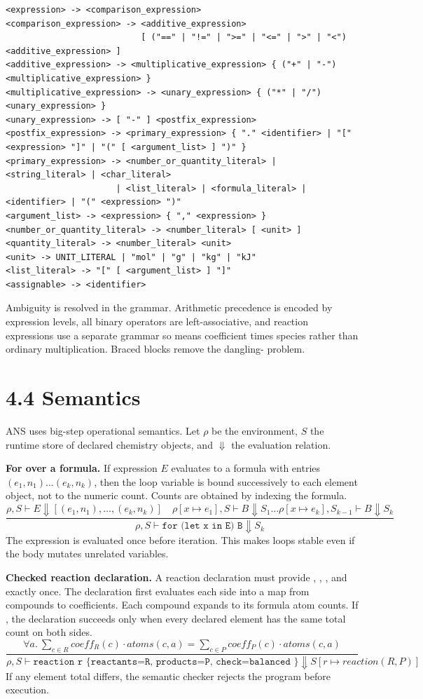 \begin{lstlisting}[style=ebnf]
<expression> -> <comparison_expression>
<comparison_expression> -> <additive_expression>
                           [ ("==" | "!=" | ">=" | "<=" | ">" | "<") <additive_expression> ]
<additive_expression> -> <multiplicative_expression> { ("+" | "-") <multiplicative_expression> }
<multiplicative_expression> -> <unary_expression> { ("*" | "/") <unary_expression> }
<unary_expression> -> [ "-" ] <postfix_expression>
<postfix_expression> -> <primary_expression> { "." <identifier> | "[" <expression> "]" | "(" [ <argument_list> ] ")" }
<primary_expression> -> <number_or_quantity_literal> | <string_literal> | <char_literal>
                      | <list_literal> | <formula_literal> | <identifier> | "(" <expression> ")"
<argument_list> -> <expression> { "," <expression> }
<number_or_quantity_literal> -> <number_literal> [ <unit> ]
<quantity_literal> -> <number_literal> <unit>
<unit> -> UNIT_LITERAL | "mol" | "g" | "kg" | "kJ"
<list_literal> -> "[" [ <argument_list> ] "]"
<assignable> -> <identifier>
\end{lstlisting}

Ambiguity is resolved in the grammar. Arithmetic precedence is encoded by expression levels, all binary operators are left-associative, and reaction expressions use a separate grammar so  means coefficient times species rather than ordinary multiplication. Braced blocks remove the dangling- problem.

\newpage
\section{4.4 Semantics}
ANS uses big-step operational semantics. Let \(\rho\) be the environment, \(S\) the runtime store of declared chemistry objects, and \(\Downarrow\) the evaluation relation.

\textbf{For over a formula.} If expression \(E\) evaluates to a formula with entries \((e_1,n_1)\ldots(e_k,n_k)\), then the loop variable is bound successively to each element object, not to the numeric count. Counts are obtained by indexing the formula.
\[
\frac{\rho,S \vdash E \Downarrow [(e_1,n_1),\ldots,(e_k,n_k)] \quad
      \rho[x \mapsto e_1],S \vdash B \Downarrow S_1 \ldots
      \rho[x \mapsto e_k],S_{k-1} \vdash B \Downarrow S_k}
     {\rho,S \vdash \texttt{for (let x in E) B} \Downarrow S_k}
\]
The expression is evaluated once before iteration. This makes loops stable even if the body mutates unrelated variables.

\textbf{Checked reaction declaration.} A reaction declaration must provide , , , and  exactly once. The declaration first evaluates each side into a map from compounds to coefficients. Each compound expands to its formula atom counts. If , the declaration succeeds only when every declared element has the same total count on both sides.
\[
\frac{\forall a.\ \sum_{c \in R} coeff_R(c)\cdot atoms(c,a)
      = \sum_{c \in P} coeff_P(c)\cdot atoms(c,a)}
     {\rho,S \vdash \texttt{reaction r \{ reactants=R, products=P, check=balanced \}} \Downarrow S[r \mapsto reaction(R,P)]}
\]
If any element total differs, the semantic checker rejects the program before execution.

